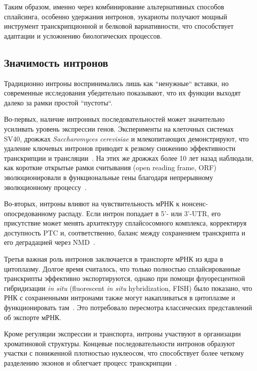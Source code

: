 Таким образом, именно через комбинирование альтернативных способов сплайсинга, особенно удержания интронов, эукариоты получают мощный инструмент транскрипционной и белковой вариативности, что способствует адаптации и усложнению биологических процессов.


\subsection{Значимость интронов}

Традиционно интроны воспринимались лишь как ``ненужные`` вставки, но современные исследования убедительно показывают, что их функции выходят далеко за рамки простой ``пустоты``.

Во-первых, наличие интронных последовательностей может значительно усиливать уровень экспрессии генов.
Эксперименты на клеточных системах SV40, дрожжах \textit{Saccharomyces cerevisiae} и млекопитающих демонстрируют, что удаление ключевых интронов приводит к резкому снижению эффективности транскрипции и трансляции~\cite{Gruss1979,Juneau2006}.
На этих же дрожжах более 10 лет назад наблюдали, как короткие открытые рамки считывания (open reading frame, ORF) эволюционировали в функциональные гены благодаря непрерывному эволюционному процессу~\cite{Carvunis2012}.

Во-вторых, интроны влияют на чувствительность мРНК к нонсенс-опосредован\-ному распаду.
Если интрон попадает в 5'- или 3'-UTR, его присутствие может менять архитектуру сплайсосомного комплекса, корректируя доступность PTC и, соответственно, баланс между сохранением транскрипта и его деградацией через NMD~\cite{Jo2015,Kalyna2012}.

Третья важная роль интронов заключается в транспорте мРНК из ядра в цитоплазму.
Долгое время считалось, что только полностью сплайсированные транскрипты эффективно экспортируются, однако при помощи флуоресцентной гибридизации \textit{in situ} (fluorescent \textit{in situ} hybridization, FISH) было показано, что РНК с сохраненными интронами также могут накапливаться в цитоплазме и функционировать там~\cite{Valencia2008,Jo2015,Roy2006}.
Это потребовало пересмотра классических представлений об экспорте мРНК.

Кроме регуляции экспрессии и транспорта, интроны участвуют в организации хроматиновой структуры.
Концевые последовательности интронов образуют участки с пониженной плотностью нуклеосом, что способствует более четкому разделению экзонов и облегчает процесс транскрипции~\cite{Schwartz2009}.

